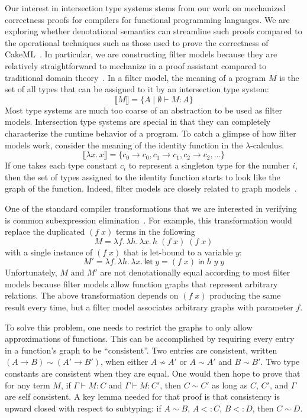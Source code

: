 \documentclass{article}
\begin{document}
Our interest in intersection type systems stems from our work on
mechanized correctness proofs for compilers for functional programming
languages. We are exploring whether denotational semantics can
streamline such proofs compared to the operational techniques such as
those used to prove the correctness of
CakeML~\citep{Kumar:2014aa,Owens:2017aa}. In particular, we are
constructing filter models because they are relatively straightforward
to mechanize in a proof assistant compared to traditional domain
theory~\citep{Benton:2009ab,Dockins:2014aa}.  In a filter model, the
meaning of a program $M$ is the set of all types that can be assigned
to it by an intersection type system:
\[
   \llbracket M \rrbracket = \{ A \mid \emptyset \vdash M : A \}
\]
Most type systems are much too coarse of an abstraction to be used as
filter models. Intersection type systems are special in that they can
completely characterize the runtime behavior of a program.  To catch a
glimpse of how filter models work, consider the meaning of the
identity function in the $\lambda$-calculus.
\[
  \llbracket \lambda x.\, x \rrbracket =
      \{ c_0 \to c_0, c_1 \to c_1, c_2 \to c_2, \ldots \}
\]
If one takes each type constant $c_i$ to represent a singleton type
for the number $i$, then the set of types assigned to the identity
function starts to look like the graph of the function. Indeed, filter
models are closely related to graph
models~\citep{Scott:1976lq,Engeler:1981aa,Plotkin:1993ab,Barendregt:2013aa}.

One of the standard compiler transformations that we are interested in
verifying is common subexpression
elimination~\citep{Downey:JACM:1980,Appel:1992fk,Tarditi:1996aa}. For
example, this transformation would replace the duplicated $(f \; x)$
terms in the following
\[
  M = \lambda f.\, \lambda h.\, \lambda x.\, h \; (f \; x) \; (f \; x)
\]
with a single instance of $(f\;x)$ that is let-bound to a variable $y$:
\[
M' = \lambda f.\, \lambda h.\, \lambda x.\,
\mathsf{let}\; y = (f \; x) \;\mathsf{in}\;
h \; y \; y
\]
Unfortunately, $M$ and $M'$ are not denotationally equal according to
most filter models because filter models allow function graphs that
represent arbitrary relations. The above transformation depends on $(f
\; x)$ producing the same result every time, but a filter model
associates arbitrary graphs with parameter $f$.

To solve this problem, one needs to restrict the graphs to only allow
approximations of functions. This can be accomplished by requiring
every entry in a function's graph to be ``consistent''. Two entries
are consistent, written $(A \to B) \sim (A' \to B')$, when either $A
\not\sim A'$ or $A \sim A'$ and $B \sim B'$. Two type constants are
consistent when they are equal. One would then hope to prove that for
any term $M$, if $\Gamma \vdash M : C$ and $\Gamma \vdash M : C'$,
then $C \sim C'$ as long as $C$, $C'$, and $\Gamma$ are self
consistent. A key lemma needed for that proof is that consistency is
upward closed with respect to subtyping: if $A \sim B$, $A <: C$, $B
<: D$, then $C \sim D$.
\end{document}
